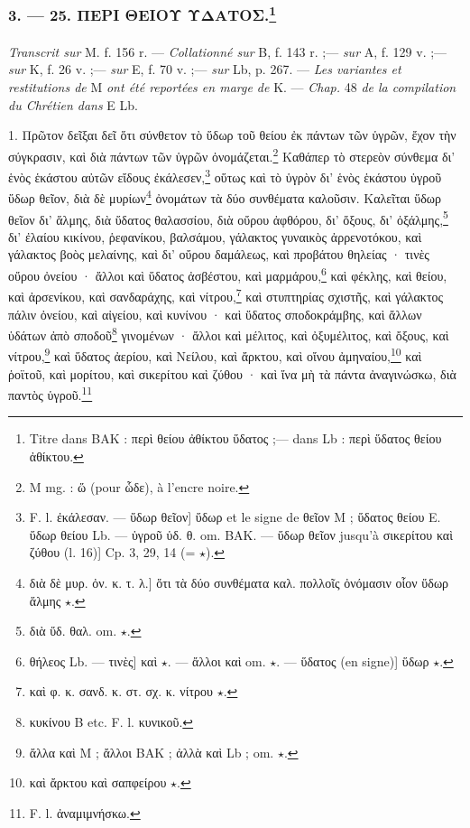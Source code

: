 \documentclass[landscape, a4paper, 11pt, oneside, polutonikogreek, french]{article}
\begin{document}
\bigskip
\centerline{\EightStarTaper}
\centerline{\EightStarTaper\EightStarTaper}
\bigskip

\subsubsection[3. --- 25. ΠΕΡΙ ΘΕΙΟΥ ΥΔΑΤΟΣ.]{3. --- 25. ΠΕΡΙ ΘΕΙΟΥ ΥΔΑΤΟΣ.\footnote{Titre dans BAK : περὶ θείου ἀθίκτου ὕδατος ;--- dans Lb : περὶ ὕδατος θείου ἀθίκτου.}}
\paragraph{}
\emph{Transcrit sur} M. f. 156 r. --- \emph{Collationné sur} B, f. 143 r. ;--- \emph{sur} A, f. 129 v. ;--- \emph{sur} K, f. 26 v. ;--- \emph{sur} E, f. 70 v. ;--- \emph{sur} Lb, p. 267. --- \emph{Les variantes et restitutions de} M \emph{ont été reportées en marge de} K. --- \emph{Chap.} 48 \emph{de la compilation du Chrétien dans} E Lb.

\bigskip

1. Πρῶτον δεῖξαι δεῖ ὅτι σύνθετον τὸ ὕδωρ τοῦ θείου ἐκ πάντων τῶν ὑγρῶν, ἔχον τὴν σύγκρασιν, καὶ διὰ πάντων τῶν ὑγρῶν ὀνομάζεται.\footnote{M mg. : ὥ (pour ὧδε), à l'encre noire.} Καθάπερ τὸ στερεὸν σύνθεμα δι' ἑνὸς ἑκάστου αὐτῶν εἴδους ἐκάλεσεν,\footnote{F. l. ἐκάλεσαν. --- ὕδωρ θεῖον] ὕδωρ et le signe de θεῖον M ; ὕδατος θείου E. ὕδωρ θείου Lb. --- ὑγροῦ ὑδ. θ. om. BAK. --- ὕδωρ θεῖον jusqu'à σικερίτου καὶ ζύθου (l. 16)] Cp. 3, 29, 14 (= $\star$).} οὕτως καὶ τὸ ὑγρὸν δι' ἑνὸς ἑκάστου ὑγροῦ ὕδωρ θεῖον, διὰ δὲ μυρίων\footnote{διὰ δὲ μυρ. ὀν. κ. τ. λ.] ὅτι τὰ δύο συνθέματα καλ. πολλοῖς ὀνόμασιν οἷον ὕδωρ ἅλμης $\star$.} ὀνομάτων τὰ δύο συνθέματα καλοῦσιν. Καλεῖται ὕδωρ θεῖον δι' ἅλμης, διὰ ὕδατος θαλασσίου, διὰ οὔρου ἀφθόρου, δι' ὄξους, δι' ὀξάλμης,\footnote{διὰ ὕδ. θαλ. om. $\star$.} δι' ἐλαίου κικίνου, ῥεφανίκου, βαλσάμου, γάλακτος γυναικὸς ἀρρενοτόκου, καὶ γάλακτος βοὸς μελαίνης, καὶ δι' οὔρου δαμάλεως, καὶ προβάτου θηλείας · τινὲς οὔρου ὀνείου · ἄλλοι καὶ ὕδατος ἀσβέστου, καὶ μαρμάρου,\footnote{θήλεος Lb. --- τινὲς] καὶ $\star$. --- ἄλλοι καὶ om. $\star$. --- ὕδατος (en signe)] ὕδωρ $\star$.} καὶ φέκλης, καὶ θείου, καὶ ἀρσενίκου, καὶ σανδαράχης, καὶ νίτρου,\footnote{καὶ φ. κ. σανδ. κ. στ. σχ. κ. νίτρου $\star$.} καὶ στυπτηρίας σχιστῆς, καὶ γάλακτος πάλιν ὀνείου, καὶ αἰγείου, καὶ κυνίνου · καὶ ὕδατος σποδοκράμβης, καὶ ἄλλων ὑδάτων ἀπὸ σποδοῦ\footnote{κυκίνου B etc. F. l. κυνικοῦ.} γινομένων · ἄλλοι καὶ μέλιτος, καὶ ὀξυμέλιτος, καὶ ὄξους, καὶ νίτρου,\footnote{ἄλλα καὶ M ; ἄλλοι BAK ; ἀλλὰ καὶ Lb ; om. $\star$.} καὶ ὕδατος ἀερίου, καὶ Νείλου, καὶ ἄρκτου, καὶ οἴνου ἀμηναίου,\footnote{καὶ ἄρκτου καὶ σαπφείρου $\star$.} καὶ ῥοϊτοῦ, καὶ μορίτου, καὶ σικερίτου καὶ ζύθου · καὶ ἵνα μὴ τὰ πάντα ἀναγινώσκω, διὰ παντὸς ὑγροῦ.\footnote{F. l. ἀναμιμνήσκω.}
\end{document}
